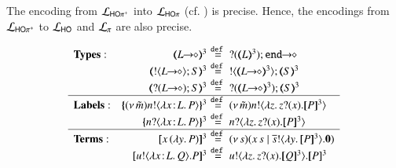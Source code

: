 \smallskip 

\begin{theorem}
\label{f:enc:hopiptohopi}
The encoding from $\mathcal{L}_{\mathsf{HO\pi^{+}}}$ into $\mathcal{L}_{\mathsf{HO}\pi}$ (cf. )
is precise. Hence, the encodings 
from $\mathcal{L}_{\mathsf{HO\pi^{+}}}$ to $\mathcal{L}_{\mathsf{HO}}$ 
and $\mathcal{L}_{\pi}$ 
are also precise. 
\end{theorem}
\smallskip 

\begin{figure}[t]
\[
{\small
\begin{array}{lrcll}
\noindent{\bf Types:} & 
		\tmap{\shot{L}}{3} &\!\!\!\!\defeq\!\!\!\!& \shot{\btinp{\tmap{L}{3}} \tinact}
		\\
&		\tmap{\btout{\shot{L}} S}{3} &\!\!\!\!\defeq\!\!\!\!& \btout{\tmap{\shot{L}}{3}} \tmap{S}{3}
		\\
&		\tmap{\btinp{\shot{L}} S}{3} &\!\!\!\!\defeq\!\!\!\!& \btinp{\tmap{\shot{L}}{3}} \tmap{S}{3}
\\
\hline
\noindent{\bf Labels:} & 
		\mapa{\news{\tilde{m}} \bactout{n}{\abs{\AT{x}{L}}{P}}}^{3} &\!\!\!\!\defeq\!\!\!\!& \news{\tilde{m}} \bactout{n}{\abs{z}{\binp{z}{x} \pmap{P}{3}}}
		\\
&		\mapa{\bactinp{n}{\abs{\AT{x}{L}}{P}}}^{3} &\!\!\!\!\defeq\!\!\!\!& \bactinp{n}{\abs{z}{\binp{z}{x} \pmap{P}{3}}}
\\
\hline
{\bf Terms}: & 
	\pmap{\appl{x}{(\abs{y} P)}}{3} &\!\!\!\!\defeq\!\!\!\!& \newsp{s}{\appl{x}{s} \Par \bout{\dual{s}}{\abs{y} \pmap{P}{3}} \inact}
		\\
&	\pmap{\bout{u}{\abs{\AT{x}{L}}{Q}} P}{3} &\!\!\!\!\defeq\!\!\!\!& \bout{u}{\abs{z}{\binp{z}{x} \pmap{Q}{3}}} \pmap{P}{3} \\

\end{array}}\]
\end{figure}
